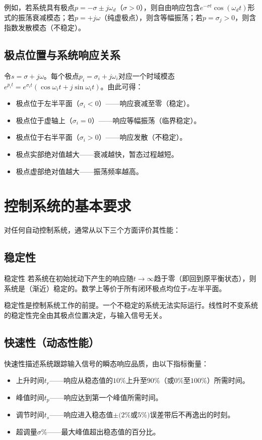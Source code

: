 例如，若系统具有极点$p = -\sigma \pm j\omega_d$（$\sigma > 0$），则自由响应包含$e^{-\sigma t}\cos(\omega_d t)$形式的振荡衰减模态；若$p = +j\omega$（纯虚极点），则含等幅振荡；若$p = \sigma_j > 0$，则含指数发散模态（不稳定）。

\subsection{极点位置与系统响应关系}

令$s = \sigma + j\omega$。每个极点$p_i = \sigma_i + j\omega_i$对应一个时域模态$e^{p_i t} = e^{\sigma_i t}(\cos\omega_i t + j\sin\omega_i t)$。由此可得：

\begin{itemize}
\item 极点位于左半平面（$\sigma_i < 0$）——响应衰减至零（稳定）。
\item 极点位于虚轴上（$\sigma_i = 0$）——响应等幅振荡（临界稳定）。
\item 极点位于右半平面（$\sigma_i > 0$）——响应发散（不稳定）。
\item 极点实部绝对值越大——衰减越快，暂态过程越短。
\item 极点虚部绝对值越大——振荡频率越高。
\end{itemize}

\section{控制系统的基本要求}

对任何自动控制系统，通常从以下三个方面评价其性能：

\subsection{稳定性}

\begin{mydefinition}{稳定性}
若系统在初始扰动下产生的响应随$t \to \infty$趋于零（即回到原平衡状态），则系统是（渐近）稳定的。数学上等价于所有闭环极点均位于$s$左半平面。
\end{mydefinition}

稳定性是控制系统工作的前提。一个不稳定的系统无法实际运行。线性时不变系统的稳定性完全由其极点位置决定，与输入信号无关。

\subsection{快速性（动态性能）}

快速性描述系统跟踪输入信号的瞬态响应品质，由以下指标衡量：
\begin{itemize}
\item 上升时间$t_r$——响应从稳态值的$10\%$上升至$90\%$（或$0\%$至$100\%$）所需时间。
\item 峰值时间$t_p$——响应达到第一个峰值所需时间。
\item 调节时间$t_s$——响应进入稳态值$\pm(2\%$或$5\%)$误差带后不再逸出的时刻。
\item 超调量$\sigma\%$——最大峰值超出稳态值的百分比。
\end{itemize}


